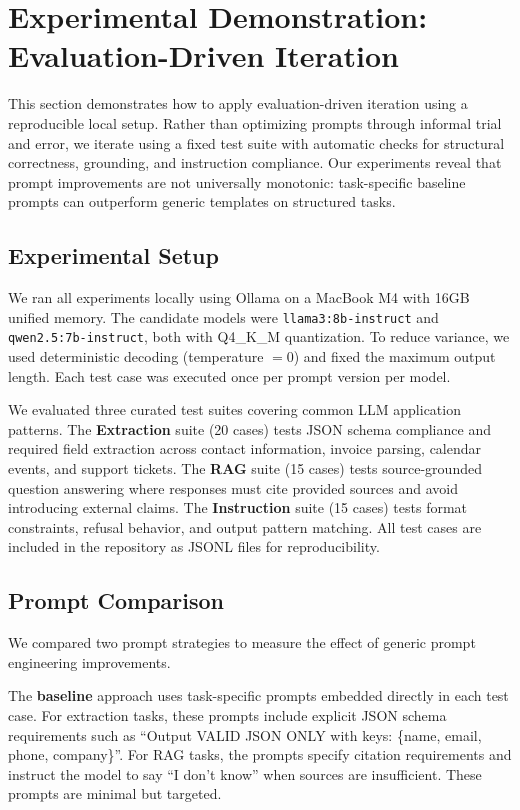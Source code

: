 
\section{Experimental Demonstration: Evaluation-Driven Iteration}
\label{sec:experiments}

This section demonstrates how to apply evaluation-driven iteration using a reproducible local setup. Rather than optimizing prompts through informal trial and error, we iterate using a fixed test suite with automatic checks for structural correctness, grounding, and instruction compliance. Our experiments reveal that prompt improvements are not universally monotonic: task-specific baseline prompts can outperform generic templates on structured tasks.

\subsection{Experimental Setup}

We ran all experiments locally using Ollama on a MacBook M4 with 16GB unified memory. The candidate models were \texttt{llama3:8b-instruct} and \texttt{qwen2.5:7b-instruct}, both with Q4\_K\_M quantization. To reduce variance, we used deterministic decoding (temperature $= 0$) and fixed the maximum output length. Each test case was executed once per prompt version per model.

We evaluated three curated test suites covering common LLM application patterns. The \textbf{Extraction} suite (20 cases) tests JSON schema compliance and required field extraction across contact information, invoice parsing, calendar events, and support tickets. The \textbf{RAG} suite (15 cases) tests source-grounded question answering where responses must cite provided sources and avoid introducing external claims. The \textbf{Instruction} suite (15 cases) tests format constraints, refusal behavior, and output pattern matching. All test cases are included in the repository as JSONL files for reproducibility.

\subsection{Prompt Comparison}

We compared two prompt strategies to measure the effect of generic prompt engineering improvements.

The \textbf{baseline} approach uses task-specific prompts embedded directly in each test case. For extraction tasks, these prompts include explicit JSON schema requirements such as ``Output VALID JSON ONLY with keys: \{name, email, phone, company\}''. For RAG tasks, the prompts specify citation requirements and instruct the model to say ``I don't know'' when sources are insufficient. These prompts are minimal but targeted.

